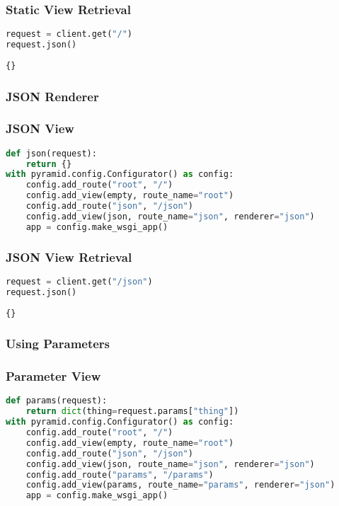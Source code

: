 \begin{frame}[fragile]
\frametitle{Static View Retrieval}

\begin{lstlisting}[language=Python]
request = client.get("/")
request.json()
\end{lstlisting}

\begin{lstlisting}
{}
\end{lstlisting}

\end{frame}

\hypertarget{json-renderer}{%
\subsubsection{JSON Renderer}\label{json-renderer}}

\begin{frame}[fragile]
\frametitle{JSON View}

\begin{lstlisting}[language=Python]
def json(request):
    return {}
with pyramid.config.Configurator() as config:
    config.add_route("root", "/")
    config.add_view(empty, route_name="root")
    config.add_route("json", "/json")
    config.add_view(json, route_name="json", renderer="json")
    app = config.make_wsgi_app()
\end{lstlisting}

\end{frame}

\begin{frame}[fragile]
\frametitle{JSON View Retrieval}

\begin{lstlisting}[language=Python]
request = client.get("/json")
request.json()
\end{lstlisting}

\begin{lstlisting}
{}
\end{lstlisting}

\end{frame}

\hypertarget{using-parameters}{%
\subsubsection{Using Parameters}\label{using-parameters}}

\begin{frame}[fragile]
\frametitle{Parameter View}

\begin{lstlisting}[language=Python]
def params(request):
    return dict(thing=request.params["thing"])
with pyramid.config.Configurator() as config:
    config.add_route("root", "/")
    config.add_view(empty, route_name="root")
    config.add_route("json", "/json")
    config.add_view(json, route_name="json", renderer="json")
    config.add_route("params", "/params")
    config.add_view(params, route_name="params", renderer="json")
    app = config.make_wsgi_app()
\end{lstlisting}

\end{frame}

